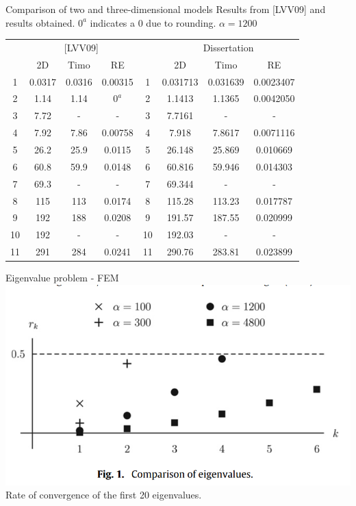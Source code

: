 \documentclass{beamer}
\begin{document}
\begin{frame}{Comparison of two and three-dimensional models}
    \centering
    \footnotesize
    \renewcommand{\arraystretch}{0.8}
    Results from [LVV09] and results obtained. $0^a$ indicates a 0 due to rounding. $\alpha = 1200$

    \begin{tabular}{cccc|cccc}
        \hline
        & \multicolumn{3}{c}{[LVV09]} & & \multicolumn{3}{c}{Dissertation} \\
        
        & 2D & Timo & RE & & 2D & Timo & RE \\
        \hline
        1 & 0.0317 & 0.0316 & 0.00315 & 1 & 0.031713 & 0.031639 & 0.0023407 \\
        2 & 1.14 & 1.14 & $0^a$ & 2 & 1.1413 & 1.1365 & 0.0042050 \\
        3 & 7.72 & - & - & 3 & 7.7161 & - & - \\
        4 & 7.92 & 7.86 & 0.00758 & 4 & 7.918 & 7.8617 & 0.0071116 \\
        5 & 26.2 & 25.9 & 0.0115 & 5 & 26.148 & 25.869 & 0.010669 \\
        6 & 60.8 & 59.9 & 0.0148 & 6 & 60.816 & 59.946 & 0.014303 \\
        7 & 69.3 & - & - & 7 & 69.344 & - & - \\
        8 & 115 & 113 & 0.0174 & 8 & 115.28 & 113.23 & 0.017787 \\
        9 & 192 & 188 & 0.0208 & 9 & 191.57 & 187.55 & 0.020999 \\
        10 & 192 & - & - & 10 & 192.03 & - & - \\
        11 & 291 & 284 & 0.0241 & 11 & 290.76 & 283.81 & 0.023899 \\
        \hline
    \end{tabular}

\end{frame}

\begin{frame}{Eigenvalue problem - FEM}
    \centering
    \includegraphics[scale=0.45]{Result.png} \\ %
    \footnotesize Rate of convergence of the first 20 eigenvalues.
    \label{fig:conv}
\end{frame}
\end{document}
